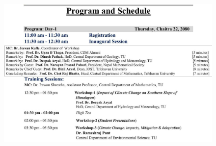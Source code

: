 \documentclass[a4paper,12pt]{report}
\begin{document}
\begin{figure}[h!]
  \centering
  \includegraphics[width=17.5cm, height=15.5cm]{p1.jpg}
\end{figure}
\clearpage
\end{document}
